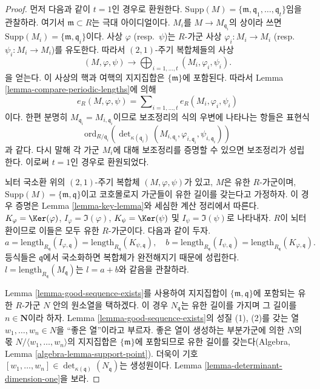 \begin{proof}
먼저 다음과 같이 $t = 1$인 경우로 환원한다.
$\text{Supp}(M) = \{\mathfrak m, \mathfrak q_1, \ldots, \mathfrak q_t\}$임을
관찰하라. 여기서 $\mathfrak m \subset R$는 극대 아이디얼이다.
$M_i$를 $M \to M_{\mathfrak q_i}$의 상이라 쓰면
$\text{Supp}(M_i) = \{\mathfrak m, \mathfrak q_i\}$이다.
사상 $\varphi$ (resp.\ $\psi$)는 $R$-가군 사상
$\varphi_i : M_i \to M_i$ (resp.\ $\psi_i : M_i \to M_i$)를 유도한다.
따라서 $(2, 1)$-주기 복합체들의 사상
$$
(M, \varphi, \psi) \longrightarrow
\bigoplus\nolimits_{i = 1, \ldots, t} (M_i, \varphi_i, \psi_i).
$$
을 얻는다. 이 사상의 핵과 여핵의 지지집합은 $\{\mathfrak m\}$에
포함된다. 따라서 Lemma \ref{lemma-compare-periodic-lengths}에 의해
$$
e_R(M, \varphi, \psi) =
\sum\nolimits_{i = 1, \ldots, t}
e_R(M_i, \varphi_i, \psi_i)
$$
이다. 한편 분명히 $M_{\mathfrak q_i} = M_{i, \mathfrak q_i}$이므로
보조정리의 식의 우변에 나타나는 항들은 표현식
$$
\text{ord}_{R/\mathfrak q_i}\left(
\det\nolimits_{\kappa(\mathfrak q_i)}
(M_{i, \mathfrak q_i}, \varphi_{i, \mathfrak q_i}, \psi_{i, \mathfrak q_i})
\right)
$$
과 같다. 다시 말해 각 가군 $M_i$에 대해 보조정리를 증명할 수 있으면
보조정리가 성립한다. 이로써 $t = 1$인 경우로 환원되었다.

\medskip\noindent
뇌터 국소환 위의 $(2, 1)$-주기 복합체 $(M, \varphi, \psi)$가 있고,
$M$은 유한 $R$-가군이며,
$\text{Supp}(M) = \{\mathfrak m, \mathfrak q\}$이고 코호몰로지
가군들이 유한 길이를 갖는다고 가정하자. 이 경우 증명은 Lemma
\ref{lemma-key-lemma}와 세심한 계산 정리에서 따른다.
$K_\varphi = \Ker(\varphi)$, $I_\varphi = \Im(\varphi)$,
$K_\psi = \Ker(\psi)$ 및 $I_\psi = \Im(\psi)$로 나타내자.
$R$이 뇌터 환이므로 이들은 모두 유한 $R$-가군이다. 다음과 같이 두자.
$$
a = \text{length}_{R_{\mathfrak q}}(I_{\varphi, \mathfrak q})
= \text{length}_{R_{\mathfrak q}}(K_{\psi, \mathfrak q}),
\quad
b = \text{length}_{R_{\mathfrak q}}(I_{\psi, \mathfrak q})
= \text{length}_{R_{\mathfrak q}}(K_{\varphi, \mathfrak q}).
$$
등식들은 $\mathfrak q$에서 국소화하면 복합체가 완전해지기 때문에
성립한다. $l = \text{length}_{R_{\mathfrak q}}(M_{\mathfrak q})$는
$l = a + b$와 같음을 관찰하라.

\medskip\noindent
Lemma \ref{lemma-good-sequence-exists}를 사용하여 지지집합이
$\{\mathfrak m, \mathfrak q\}$에 포함되는 유한 $R$-가군 $N$ 안의
원소열을 택하겠다. 이 경우 $N_{\mathfrak q}$는 유한 길이를 가지며
그 길이를 $n \in \mathbf{N}$이라 하자. Lemma
\ref{lemma-good-sequence-exists}의 성질 (1), (2)를 갖는 열
$w_1, \ldots, w_n \in N$을 ``좋은 열''이라고 부르자.
좋은 열이 생성하는 부분가군에 의한 $N$의 몫
$N/\langle w_1, \ldots, w_n \rangle$의 지지집합은
$\{\mathfrak m\}$에 포함되므로 유한 길이를 갖는다(Algebra, Lemma
\ref{algebra-lemma-support-point}). 더욱이 기호
$[w_1, \ldots, w_n] \in \det_{\kappa(\mathfrak q)}(N_{\mathfrak q})$는
생성원이다. Lemma \ref{lemma-determinant-dimension-one}을 보라.


\end{proof}
